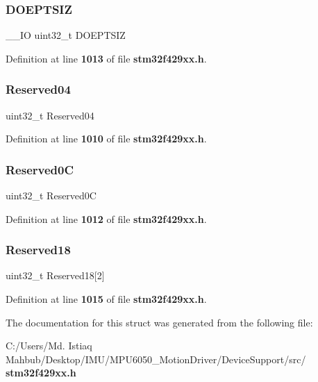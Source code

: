 \subsubsection{D\+O\+E\+P\+T\+S\+IZ}
{\footnotesize\ttfamily \+\_\+\+\_\+\+IO uint32\+\_\+t D\+O\+E\+P\+T\+S\+IZ}



Definition at line \textbf{ 1013} of file \textbf{ stm32f429xx.\+h}.

\mbox{\label{structUSB__OTG__OUTEndpointTypeDef_acfe7efaa61db86840767dff6d73f8695}} 
\subsubsection{Reserved04}
{\footnotesize\ttfamily uint32\+\_\+t Reserved04}



Definition at line \textbf{ 1010} of file \textbf{ stm32f429xx.\+h}.

\mbox{\label{structUSB__OTG__OUTEndpointTypeDef_a1bcc039378b4ed4ac1261a0a758c3d1d}} 
\subsubsection{Reserved0C}
{\footnotesize\ttfamily uint32\+\_\+t Reserved0C}



Definition at line \textbf{ 1012} of file \textbf{ stm32f429xx.\+h}.

\mbox{\label{structUSB__OTG__OUTEndpointTypeDef_a78fbe0aab076cfbf9df51dd6f67eaf82}} 
\subsubsection{Reserved18}
{\footnotesize\ttfamily uint32\+\_\+t Reserved18[2]}



Definition at line \textbf{ 1015} of file \textbf{ stm32f429xx.\+h}.



The documentation for this struct was generated from the following file\+:\begin{DoxyCompactItemize}
\item 
C\+:/\+Users/\+Md. Istiaq Mahbub/\+Desktop/\+I\+M\+U/\+M\+P\+U6050\+\_\+\+Motion\+Driver/\+Device\+Support/src/\textbf{ stm32f429xx.\+h}\end{DoxyCompactItemize}

